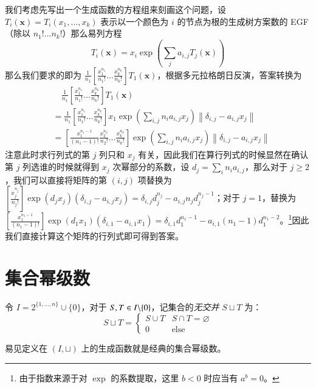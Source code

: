 \begin{solution}
我们考虑先写出一个生成函数的方程组来刻画这个问题，设 $T_i(\mathbf x)=T_i(x_1,\dots,x_k)$ 表示以一个颜色为 $i$ 的节点为根的生成树方案数的 EGF（除以 $n_1!\dots n_k!$）那么易列方程
$$
T_i(\mathbf x)=x_i \exp \left(\sum_j a_{i,j} T_j(\mathbf x) \right)
$$
那么我们要求的即为 $\frac 1{n_1}\left[\frac{x_1^{n_1}}{n_1!}\dots\frac{x_k^{n_k}}{n_k!}\right] T_1(\mathbf x)$，根据多元拉格朗日反演，答案转换为
\begin{align*}
&\quad\frac 1{n_1}\left[\frac{x_1^{n_1}}{n_1!}\dots\frac{x_k^{n_k}}{n_k!}\right] T_1(\mathbf x)\\
&= \frac 1{n_1}\left[\frac{x_1^{n_1}}{n_1!}\dots\frac{x_k^{n_k}}{n_k!}\right] x_1\exp\left(\sum_{i,j} n_ia_{i,j}x_j\right) \left \| \delta_{i,j}-a_{i,j}x_j \right\|\\
&= \left[\frac{x_1^{n_1-1}}{(n_1-1)!}\frac{x_2^{n_2}}{n_2!}\dots\frac{x_k^{n_k}}{n_k!}\right] \exp\left(\sum_{i,j} n_ia_{i,j}x_j\right) \left \| \delta_{i,j}-a_{i,j}x_j \right\|
\end{align*}
注意此时求行列式的第 $j$ 列只和 $x_j$ 有关，因此我们在算行列式的时候显然在确认第 $j$ 列选谁的时候就得到 $x_j$ 次幂部分的系数，设 $d_j=\sum_i n_ia_{i,j}$，那么对于 $j\ge 2$，我们可以直接将矩阵的第 $(i,j)$ 项替换为 $\left[\frac{x_j^{n_j}}{n_j!}\right] \exp (d_jx_j)(\delta_{i,j} - a_{i,j}x_j) = \delta_{i,j} d_j^{n_j} - a_{i,j} n_j d_j^{n_j-1}$；对于 $j=1$，替换为 $\left[\frac{x_1^{n_1-1}}{(n_1-1)!}\right] \exp (d_1x_1)(\delta_{i,1} - a_{i,1}x_1) = \delta_{i,1} d_1^{n_1-1} - a_{i,1} (n_1-1) d_1^{n_1-2}$。\footnote{由于指数来源于对 $\exp$ 的系数提取，这里 $b<0$ 时应当有 $a^b=0$。}因此我们直接计算这个矩阵的行列式即可得到答案。
\end{solution}

\section{集合幂级数}

\begin{definition}[集合幂级数的集合定义]
令 $I=2^{\{1,\dots,n\}}\cup\{0\}$，对于 $S,T\in {I \backslash \{0\}}$，记集合的\emph{无交并} $S\sqcup T$ 为：
$$
S\sqcup T = \begin{cases}
S \cup T & S\cap T = \varnothing\\
0 & \mathrm{else}
\end{cases}
$$

易见定义在 $(I,\sqcup)$ 上的生成函数就是经典的集合幂级数。
\end{definition}

